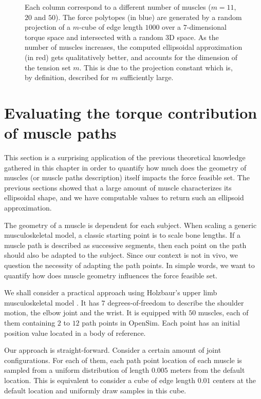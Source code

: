 \begin{figure}[!htb]
    
    \caption{Each column correspond to a different number of muscles ($m=11$, $20$ and $50$). The force polytopes (in blue) are generated by a random projection of a $m$-cube of edge length $1000$ over a $7$-dimensional torque space and intersected with a random $3$D space. As the number of muscles increases, the computed ellipsoidal approximation (in red) gets qualitatively better, and accounts for the dimension of the tension set $m$. This is due to the projection constant which is, by definition, described for $m$ sufficiently large.
    }
    \label{fig:example_proj_constant_applied}
\end{figure}


\section{Evaluating the torque contribution of muscle paths}
\label{sec:sensitivity}

This section is a surprising application of the previous theoretical knowledge gathered in this chapter in order to quantify how much does the geometry of muscles (or muscle paths description) itself impacts the force feasible set. The previous sections showed that a large amount of muscle characterizes its ellipsoidal shape, and we have computable values to return such an ellipsoid approximation.

The geometry of a muscle is dependent for each subject. When scaling a generic musculoskeletal model, a classic starting point is to scale bone lengths. If a muscle path is described as successive segments, then each point on the path should also be adapted to the subject. Since our context is not in vivo, we question the necessity of adapting the path points. In simple words, we want to quantify how does muscle geometry influences the force feasible set.

We shall consider a practical approach using Holzbaur's upper limb musculoskeletal model \cite{holzbaurModelUpperExtremity2005}. It has $7$ degrees-of-freedom to describe the shoulder motion, the elbow joint and the wrist. It is equipped with $50$ muscles, each of them containing $2$ to $12$ path points in OpenSim. Each point has an initial position value located in a body of reference.

Our approach is straight-forward. Consider a certain amount of joint configurations. For each of them, each path point location of each muscle is sampled from a uniform distribution of length $0.005$ meters from the default location. This is equivalent to consider a cube of edge length $0.01$ centers at the default location and uniformly draw samples in this cube. 

